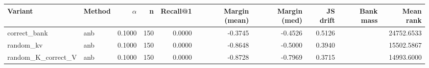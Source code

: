 \begin{tabular}{l l r r r r r r r r}
\toprule
Variant & Method & $\alpha$ & n & Recall@1 & Margin (mean) & Margin (med) & JS drift & Bank mass & Mean rank \\
\midrule
correct\_bank & anb & 0.1000 & 150 & 0.0000 & -0.3745 & -0.4526 & 0.5126 &  & 24752.6533 \\
random\_kv & anb & 0.1000 & 150 & 0.0000 & -0.8648 & -0.5000 & 0.3940 &  & 15502.5867 \\
random\_K\_correct\_V & anb & 0.1000 & 150 & 0.0000 & -0.8728 & -0.7969 & 0.3715 &  & 14993.6000 \\
\bottomrule
\end{tabular}
